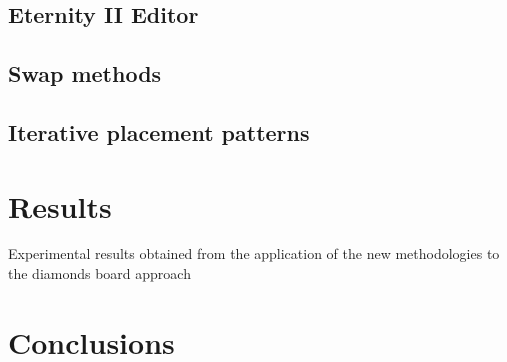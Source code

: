 \documentclass{llncs}
\begin{document}
\subsection{Eternity II Editor}

\subsection{Swap methods}

\subsection{Iterative placement patterns}

\section{Results}

Experimental results obtained from the application of the new methodologies to the diamonds board approach

\section{Conclusions}

%
%

\end{document}
